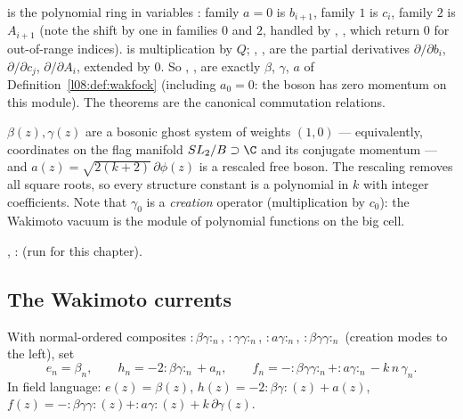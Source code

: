 \begin{dictionary}
 is the polynomial ring in variables : family
$a=0$ is $b_{i+1}$, family $1$ is $c_i$, family $2$ is $A_{i+1}$ (note the shift by one in families
$0$ and $2$, handled by , , which return $0$ for out-of-range indices). 
is multiplication by $Q$; , ,  are the partial derivatives
$\partial/\partial b_i$, $\partial/\partial c_j$, $\partial/\partial A_i$, extended by $0$. So
, ,  are exactly $\beta$, $\gamma$, $a$ of Definition~\ref{l08:def:wakfock}
(including $a_0 = 0$: the boson has zero momentum on this module). The theorems are the canonical
commutation relations.
\end{dictionary}

\begin{physics}
$\beta(z),\gamma(z)$ are a bosonic ghost system of weights $(1,0)$ --- equivalently, coordinates on
the flag manifold $SL_2/B\supset\C$ and its conjugate momentum --- and $a(z) = \sqrt{2(k+2)}\,\partial\phi(z)$
is a rescaled free boson. The rescaling removes all square roots, so every structure constant is a
polynomial in $k$ with integer coefficients. Note that $\gamma_0$ is a \emph{creation} operator
(multiplication by $c_0$): the Wakimoto vacuum is the module of polynomial functions on the big cell.
\end{physics}

\begin{status}
, : \lean{[propext, Classical.}\allowbreak{}\allowbreak\lean{sound]} (run for this
chapter).
\end{status}

\subsection{The Wakimoto currents}

\begin{definition}\label{l08:def:wakcur}
With normal-ordered composites ${:}\beta\gamma{:}_n$, ${:}\gamma\gamma{:}_n$, ${:}a\gamma{:}_n$,
${:}\beta\gamma\gamma{:}_n$ (creation modes to the left), set
\begin{equation}\label{l08:eq:wakimoto}
  e_n = \beta_n,\qquad h_n = -2{:}\beta\gamma{:}_n + a_n,\qquad
  f_n = -{:}\beta\gamma\gamma{:}_n + {:}a\gamma{:}_n - k\,n\,\gamma_n .
\end{equation}
In field language: $e(z)=\beta(z)$, $h(z) = -2{:}\beta\gamma{:}(z)+a(z)$,
$f(z) = -{:}\beta\gamma\gamma{:}(z) + {:}a\gamma{:}(z) + k\,\partial\gamma(z)$.
\end{definition}

